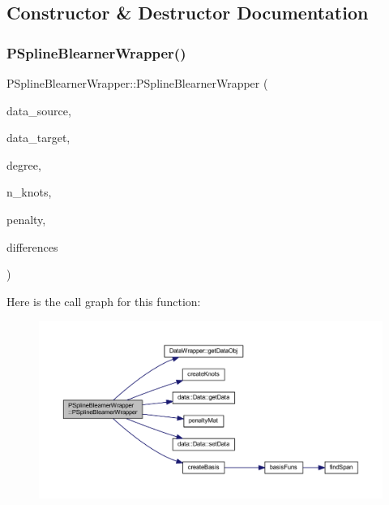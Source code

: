 \subsection{Constructor \& Destructor Documentation}
\mbox{\label{class_p_spline_blearner_wrapper_a1272a29283aa7815d2f4d06ba70cecf6}} 
\subsubsection{\texorpdfstring{P\+Spline\+Blearner\+Wrapper()}{PSplineBlearnerWrapper()}}
{\footnotesize\ttfamily P\+Spline\+Blearner\+Wrapper\+::\+P\+Spline\+Blearner\+Wrapper (\begin{DoxyParamCaption}\item[{\mbox{\hyperlink{class_data_wrapper}{Data\+Wrapper}} \&}]{data\+\_\+source,  }\item[{\mbox{\hyperlink{class_data_wrapper}{Data\+Wrapper}} \&}]{data\+\_\+target,  }\item[{const unsigned int \&}]{degree,  }\item[{const unsigned int \&}]{n\+\_\+knots,  }\item[{const double \&}]{penalty,  }\item[{const unsigned int \&}]{differences }\end{DoxyParamCaption})\hspace{0.3cm}{\ttfamily [inline]}}

Here is the call graph for this function\+:\nopagebreak
\begin{figure}[H]
\begin{center}
\leavevmode
\includegraphics[width=350pt]{class_p_spline_blearner_wrapper_a1272a29283aa7815d2f4d06ba70cecf6_cgraph}
\end{center}
\end{figure}


